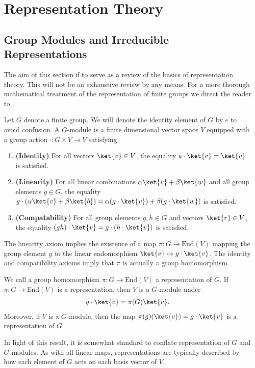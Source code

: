 \section{Representation Theory}\label{sec:rep-theory}

\subsection{Group Modules and Irreducible Representations}

The aim of this section if to serve as a review of the basics of representation theory.
This will not be an exhaustive review by any means.
For a more thorough mathematical treatment of the representation of finite groups we direct the reader to \cite{sagan2001symmetric}.

Let $G$ denote a finite group. We will denote the identity element of $G$ by $e$ to avoid confusion. 
A $G$-module is a finite dimensional vector space $V$ equipped with a group action $\cdot : G \times V \to V$ satisfying 
\begin{enumerate}
    \item \textbf{(Identity)} For all vectors $\ket{v} \in V$, the equality $e \cdot \ket{v} = \ket{v}$ is satisfied.
    \item \textbf{(Linearity)} For all linear combinations $\alpha \ket{v} + \beta \ket{w}$ and all group elements $g \in G$, the equality $g \cdot (\alpha \ket{v}+\beta\ket{b}) = \alpha (g\cdot \ket{v}) + \beta (g \cdot \ket{w})$ is satisfied.
    \item \textbf{(Compatability)} For all group elements $g,h \in G$ and vectors $\ket{v} \in V$, the equality $(gh) \cdot \ket{v} = g\cdot (h \cdot \ket{v})$ is satisfied.
\end{enumerate}
The linearity axiom implies the existence of a map $\pi: G \to \mathrm{End}(V)$ mapping the group element $g$ to the linear endomorphism $\ket{v} \mapsto g\cdot \ket{v}$. 
The identity and compatibility axioms imply that $\pi$ is actually a group homomorphism. 

\begin{lemma}
    We call a group homomorphism $\pi : G \to \mathrm{End}(V)$ a representation of $G$. If $\pi: G \to \mathrm{End}(V)$ is a representation, then $V$ is a $G$-module under 
    \begin{align}
        g \cdot \ket{v} = \pi(G)\ket{v}.
    \end{align}
    Moreover, if $V$ is a $G$-module, then the map $\pi(g)(\ket{v}) = g\cdot \ket{v}$ is a representation of $G$.
\end{lemma}
In light of this result, it is somewhat standard to conflate representation of $G$ and $G$-modules. 
As with all linear maps, representations are typically described by how each element of $G$ acts on each basis vector of $V$.

